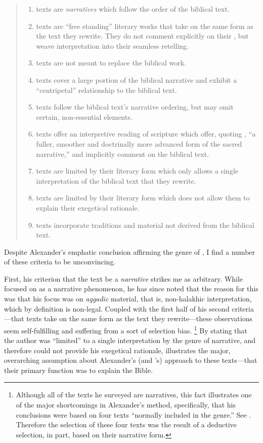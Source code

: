 \begin{quote}
\begin{enumerate}
    \item \rwb texts are \emph{narratives} which follow the order of the biblical text. 
    \item \rwb texts are ``free standing'' literary works that take on the same form as the text they rewrite. They do not comment explicitly on their \vorlagen, but weave interpretation into their seamless retelling. 
    \item \rwb texts are not meant to replace the biblical work. 
    \item \rwb texts cover a large portion of the biblical narrative and exhibit a ``centripetal'' relationship to the biblical text. 
    \item \rwb texts follow the biblical text's narrative ordering, but may omit certain, non-essential elements. 
    \item \rwb texts offer an interpretive reading of scripture which offer, quoting \vermes, ``a fuller, smoother and doctrinally more advanced form of the sacred narrative,''\autocite[Citing \vermes in][305]{schurer1986} and implicitly comment on the biblical text. 
    \item \rwb texts are limited by their literary form which only allows a single interpretation of the biblical text that they rewrite. 
    \item \rwb texts are limited by their literary form which does not allow them to explain their exegetical rationale. 
    \item \rwb texts incorporate traditions and material not derived from the biblical text.%
        \autocite{alexander_carson-williamson1988}
\end{enumerate}
\end{quote} 

Despite Alexander's emphatic conclusion affirming the genre of \rwb, I find a number of these criteria to be unconvincing.

First, his criterion that the text be a \emph{narrative} strikes me as arbitrary. While \vermes focused on \rwb as a narrative phenomenon, he has since noted that the reason for this was that his focus was on \emph{aggadic} material, that is, non-halakhic interpretation, which by definition is non-legal. Coupled with the first half of his second criteria---that \rwb texts take on the same form as the text they rewrite---these observations seem self-fulfilling and suffering from a sort of selection bias.%
    \footnote{%
        Although all of the texts he surveyed are narratives, this fact illustrates one of the major shortcomings in Alexander's method, specifically, that his conclusions were based on four texts ``normally included in the genre.'' See 
        \cite[99]{alexander_carson-williamson1988}. 
        Therefore the selection of these four texts was the result of a deductive selection, in part, based on their narrative form.}
By stating that the author was ``limited'' to a single interpretation by the genre of narrative, and therefore could not provide his exegetical rationale, illustrates the major, overarching assumption about Alexander's (and \vermes's) approach to these texts---that their primary function was to explain the Bible.


